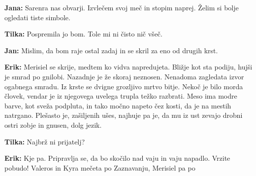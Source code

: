 \textbf{Jana:} Sarenra nas obvarji. Izvlečem svoj meč in stopim naprej. Želim si bolje ogledati tiste simbole.

\textbf{Tilka:} Pospremila jo bom. Tole mi ni čisto nič všeč.

\textbf{Jan:} Mislim, da bom raje ostal zadaj in se skril za eno od drugih krst.

\textbf{Erik:} Merisiel se skrije, medtem ko vidva napredujeta. Bližje kot sta podiju, hujši je smrad po gnilobi. Nazadnje je že skoraj neznosen. Nenadoma zagledata izvor ogabnega smradu. Iz krste se dvigne grozljivo mrtvo bitje. Nekoč je bilo morda človek, vendar je iz njegovega uvelega trupla težko razbrati. Meso ima modre barve, kot sveža podpluta, in tako močno napeto čez kosti, da je na mestih natrgano. Plešasto je, zašiljenih ušes, najhuje pa je, da mu iz ust zevajo drobni ostri zobje in gnusen, dolg jezik.

\textbf{Tilka:} Najbrž ni prijatelj?

\textbf{Erik:} Kje pa. Pripravlja se, da bo skočilo nad vaju in vaju napadlo. Vrzite pobudo! Valeros in Kyra mečeta po Zaznavanju, Merisiel pa po 